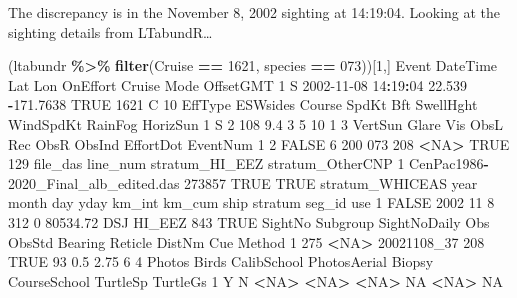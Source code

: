 \documentclass[
]{book}
\newenvironment{Shaded}{\begin{snugshade}}{\end{snugshade}}
\newcommand{\ConstantTok}[1]{\textcolor[rgb]{0.56,0.35,0.01}{#1}}
\newcommand{\DecValTok}[1]{\textcolor[rgb]{0.00,0.00,0.81}{#1}}
\newcommand{\ErrorTok}[1]{\textcolor[rgb]{0.64,0.00,0.00}{\textbf{#1}}}
\newcommand{\FloatTok}[1]{\textcolor[rgb]{0.00,0.00,0.81}{#1}}
\newcommand{\FunctionTok}[1]{\textcolor[rgb]{0.13,0.29,0.53}{\textbf{#1}}}
\newcommand{\NormalTok}[1]{#1}
\newcommand{\SpecialCharTok}[1]{\textcolor[rgb]{0.81,0.36,0.00}{\textbf{#1}}}
\newcommand{\StringTok}[1]{\textcolor[rgb]{0.31,0.60,0.02}{#1}}
\begin{document}
The discrepancy is in the November 8, 2002 sighting at 14:19:04. Looking at the sighting details from LTabundR\ldots{}

\begin{Shaded}
\begin{Highlighting}[]
\NormalTok{(ltabundr }\SpecialCharTok{\%\textgreater{}\%} \FunctionTok{filter}\NormalTok{(Cruise }\SpecialCharTok{==} \DecValTok{1621}\NormalTok{, species }\SpecialCharTok{==} \StringTok{\textquotesingle{}073\textquotesingle{}}\NormalTok{))[}\DecValTok{1}\NormalTok{,]}
\NormalTok{  Event            DateTime    Lat       Lon OnEffort Cruise Mode OffsetGMT}
\DecValTok{1}\NormalTok{     S }\DecValTok{2002{-}11{-}08} \DecValTok{14}\SpecialCharTok{:}\DecValTok{19}\SpecialCharTok{:}\DecValTok{04} \FloatTok{22.539} \SpecialCharTok{{-}}\FloatTok{171.7638}     \ConstantTok{TRUE}   \DecValTok{1621}\NormalTok{    C        }\DecValTok{10}
\NormalTok{  EffType ESWsides Course SpdKt Bft SwellHght WindSpdKt RainFog HorizSun}
\DecValTok{1}\NormalTok{       S        }\DecValTok{2}    \DecValTok{108}   \FloatTok{9.4}   \DecValTok{3}         \DecValTok{5}        \DecValTok{10}       \DecValTok{1}        \DecValTok{3}
\NormalTok{  VertSun Glare Vis ObsL Rec ObsR ObsInd EffortDot EventNum}
\DecValTok{1}       \DecValTok{2} \ConstantTok{FALSE}   \DecValTok{6}  \DecValTok{200} \DecValTok{073}  \DecValTok{208}   \SpecialCharTok{\textless{}}\ConstantTok{NA}\SpecialCharTok{\textgreater{}}      \ConstantTok{TRUE}      \DecValTok{129}
\NormalTok{                              file\_das line\_num stratum\_HI\_EEZ stratum\_OtherCNP}
\DecValTok{1}\NormalTok{ CenPac1986}\SpecialCharTok{{-}}\NormalTok{2020\_Final\_alb\_edited.das   }\DecValTok{273857}           \ConstantTok{TRUE}             \ConstantTok{TRUE}
\NormalTok{  stratum\_WHICEAS year month day yday km\_int   km\_cum ship stratum seg\_id  use}
\DecValTok{1}           \ConstantTok{FALSE} \DecValTok{2002}    \DecValTok{11}   \DecValTok{8}  \DecValTok{312}      \DecValTok{0} \FloatTok{80534.72}\NormalTok{  DSJ  HI\_EEZ    }\DecValTok{843} \ConstantTok{TRUE}
\NormalTok{  SightNo Subgroup SightNoDaily Obs ObsStd Bearing Reticle DistNm Cue Method}
\DecValTok{1}     \DecValTok{275}     \SpecialCharTok{\textless{}}\ConstantTok{NA}\SpecialCharTok{\textgreater{}}\NormalTok{  20021108\_37 }\DecValTok{208}   \ConstantTok{TRUE}      \DecValTok{93}     \FloatTok{0.5}   \FloatTok{2.75}   \DecValTok{6}      \DecValTok{4}
\NormalTok{  Photos Birds CalibSchool PhotosAerial Biopsy CourseSchool TurtleSp TurtleGs}
\DecValTok{1}\NormalTok{      Y     N        }\SpecialCharTok{\textless{}}\ConstantTok{NA}\SpecialCharTok{\textgreater{}}         \ErrorTok{\textless{}}\ConstantTok{NA}\SpecialCharTok{\textgreater{}}   \ErrorTok{\textless{}}\ConstantTok{NA}\SpecialCharTok{\textgreater{}}           \ConstantTok{NA}     \SpecialCharTok{\textless{}}\ConstantTok{NA}\SpecialCharTok{\textgreater{}}       \ConstantTok{NA}

\end{Highlighting}
\end{Shaded}
\end{document}
